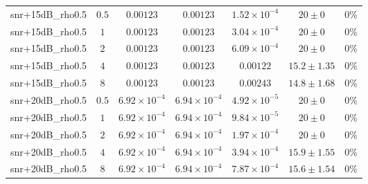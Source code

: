\begin{longtable}{@{}lcccccc@{}}
snr+15dB\_rho0.5 & \(0.5\) & \(0.00123\) & \(0.00123\) & \(1.52{\times}10^{-4}\) & \(20 \pm 0\) & 0\% \\
snr+15dB\_rho0.5 & \(1\) & \(0.00123\) & \(0.00123\) & \(3.04{\times}10^{-4}\) & \(20 \pm 0\) & 0\% \\
snr+15dB\_rho0.5 & \(2\) & \(0.00123\) & \(0.00123\) & \(6.09{\times}10^{-4}\) & \(20 \pm 0\) & 0\% \\
snr+15dB\_rho0.5 & \(4\) & \(0.00123\) & \(0.00123\) & \(0.00122\) & \(15.2 \pm 1.35\) & 0\% \\
snr+15dB\_rho0.5 & \(8\) & \(0.00123\) & \(0.00123\) & \(0.00243\) & \(14.8 \pm 1.68\) & 0\% \\
snr+20dB\_rho0.5 & \(0.5\) & \(6.92{\times}10^{-4}\) & \(6.94{\times}10^{-4}\) & \(4.92{\times}10^{-5}\) & \(20 \pm 0\) & 0\% \\
snr+20dB\_rho0.5 & \(1\) & \(6.92{\times}10^{-4}\) & \(6.94{\times}10^{-4}\) & \(9.84{\times}10^{-5}\) & \(20 \pm 0\) & 0\% \\
snr+20dB\_rho0.5 & \(2\) & \(6.92{\times}10^{-4}\) & \(6.94{\times}10^{-4}\) & \(1.97{\times}10^{-4}\) & \(20 \pm 0\) & 0\% \\
snr+20dB\_rho0.5 & \(4\) & \(6.92{\times}10^{-4}\) & \(6.94{\times}10^{-4}\) & \(3.94{\times}10^{-4}\) & \(15.9 \pm 1.55\) & 0\% \\
snr+20dB\_rho0.5 & \(8\) & \(6.92{\times}10^{-4}\) & \(6.94{\times}10^{-4}\) & \(7.87{\times}10^{-4}\) & \(15.6 \pm 1.54\) & 0\% \\
\bottomrule
\end{longtable}
